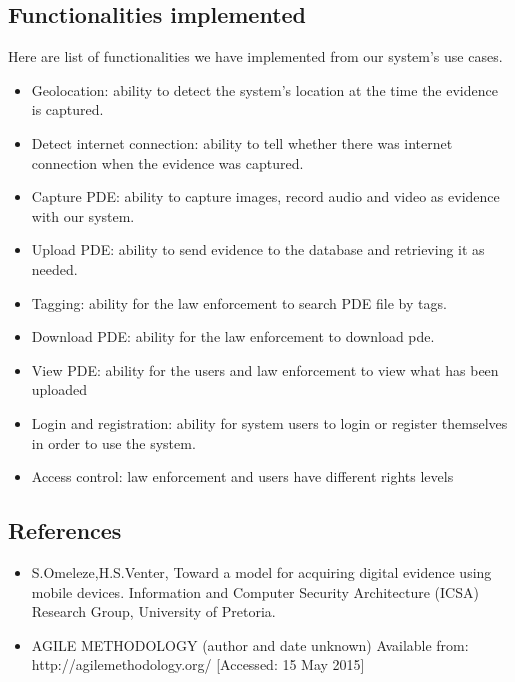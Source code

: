 \documentclass[a4paper,12pt]{article}
\begin{document}
\subsection{Functionalities implemented}
Here are list of functionalities we have implemented from our system's use cases.
\begin{itemize}
	\item Geolocation: ability to detect the system's location at the time the evidence is captured.
	\item Detect internet connection: ability to tell whether there was internet connection when the evidence was captured.
	\item Capture PDE: ability to capture images, record audio and video as evidence with our system.
	\item Upload PDE: ability to send evidence to the database and retrieving it as needed.
	\item Tagging: ability for the law enforcement to search PDE file by tags.
	\item Download PDE: ability for the law enforcement to download pde.
	\item View PDE: ability for the users and law enforcement to view what has been uploaded
	\item Login and registration: ability for system users to login or register themselves in order to use the system.
	\item Access control: law enforcement and users have different rights levels
\end{itemize}

\newpage
\subsection{References}
\begin{itemize}
\item S.Omeleze,H.S.Venter, Toward a model for acquiring digital evidence using mobile devices. Information and Computer Security Architecture (ICSA) Research Group, University of Pretoria.
\item AGILE METHODOLOGY (author and date unknown)
	Available from: http://agilemethodology.org/ [Accessed: 15 May 2015]
\end{itemize}
\end{document}
